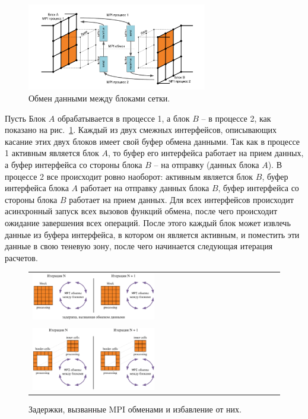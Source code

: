 \begin{figure}[ht]
\centering
\includegraphics[width=0.7\textwidth]{fig/par_10-data-exchange.pdf}
\singlespacing
{}\caption{Обмен данными между блоками сетки.}
\label{fig:text_2_block_data_exchange}
\end{figure}

Пусть Блок $A$ обрабатывается в процессе 1, а блок $B$ -- в процессе 2, как показано на рис.~\ref{fig:text_2_block_data_exchange}.
Каждый из двух смежных интерфейсов, описывающих касание этих двух блоков имеет свой буфер обмена данными.
Так как в процессе 1 активным является блок $A$, то буфер его интерфейса работает на прием данных, а буфер интерфейса со стороны блока $B$ -- на отправку (данных блока $A$).
В процессе 2 все происходит ровно наоборот: активным является блок $B$, буфер интерфейса блока $A$ работает на отправку данных блока $B$, буфер интерфейса со стороны блока $B$ работает на прием данных.
Для всех интерфейсов происходит асинхронный запуск всех вызовов функций обмена, после чего происходит ожидание завершения всех операций.
После этого каждый блок может извлечь данные из буфера интерфейса, в котором он является активным, и поместить эти данные в свою теневую зону, после чего начинается следующая итерация расчетов.

\begin{figure}[ht]
\centering
\begin{tabular}{l}
\includegraphics[width=0.5\textwidth]{fig/par_11-mpi1.png}
\\
\\
\includegraphics[width=0.5\textwidth]{fig/par_12-mpi2.png}
\end{tabular}
\singlespacing
{}\caption{Задержки, вызванные MPI\label{abbr:mpi-3} обменами и избавление от них.}
\label{fig:text_2_block_mpi1}
\end{figure}

